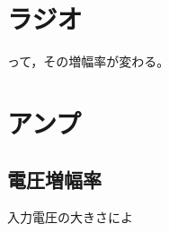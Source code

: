 \documentclass[report.tex]{subfiles}
\begin{document}
\section{ラジオ}
って，その増幅率が変わる。%

\section{アンプ}
\subsection{電圧増幅率}
入力電圧の大きさによ
\end{document}
